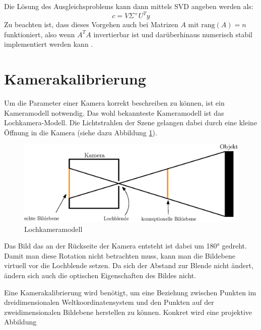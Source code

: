 Die Lösung des Ausgleichsproblems kann dann mittels SVD angeben werden als:
\[
c = V\Sigma^+U^Ty
\]
Zu beachten ist, dass dieses Vorgehen auch bei Matrizen $A$ mit $\text{rang}\left(A\right) = n$ funktioniert, also wenn $A^TA$ invertierbar ist und darüberhinaus numerisch stabil implementiert werden kann \cite{Stoer2011}.



\section{Kamerakalibrierung}
\label{s:calib}

Um die Parameter einer Kamera korrekt beschreiben zu können, ist ein Kameramodell notwendig. Das wohl bekannteste Kameramodell ist das Lochkamera-Modell. Die Lichtstrahlen der Szene gelangen dabei durch eine kleine Öffnung in die Kamera (siehe dazu Abbildung \ref{fig:pinhole}).
\begin{figure}[!htb]
	\centering
	\includegraphics[scale=.8]{images/pinhole2.eps}
	\caption{Lochkameramodell}
	\label{fig:pinhole}
\end{figure}

Das Bild das an der Rückseite der Kamera entsteht ist dabei um 180° gedreht. Damit man diese Rotation nicht betrachten muss, kann man die Bildebene virtuell vor die Lochblende setzen. Da sich der Abstand zur Blende nicht ändert, ändern sich auch die optischen Eigenschaften des Bildes nicht.

Eine Kamerakalibrierung wird benötigt, um eine Beziehung zwischen Punkten im dreidimensionalen Weltkoordinatensystem und den Punkten auf der zweidimensionalen Bildebene herstellen zu können. Konkret wird eine projektive Abbildung

